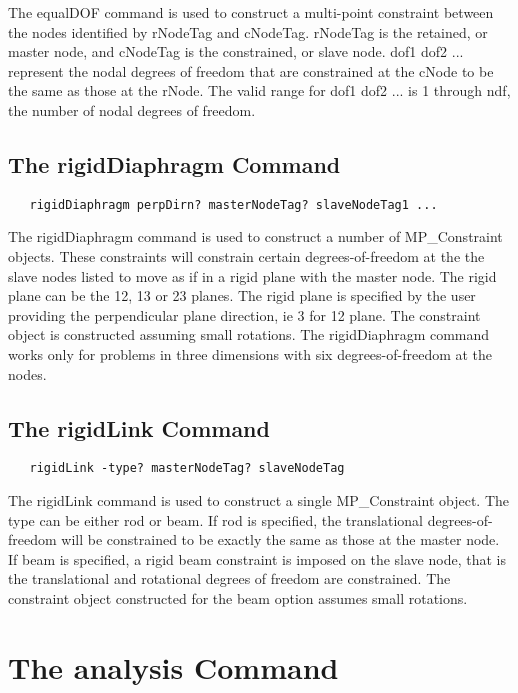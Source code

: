 \documentclass[12pt]{article}
\begin{document}
The equalDOF command is used to construct a multi-point constraint between
the nodes identified by rNodeTag and cNodeTag. rNodeTag is the retained, or
master node, and cNodeTag is the constrained, or slave node. dof1 dof2 ... 
represent the nodal degrees of freedom that are constrained at the cNode to
be the same as those at the rNode. The valid range for dof1 dof2 ... is 1
through ndf, the number of nodal degrees of freedom.

\subsection{The rigidDiaphragm Command}
{\sf\small
\begin{verbatim}
   rigidDiaphragm perpDirn? masterNodeTag? slaveNodeTag1 ...
\end{verbatim}
}

The rigidDiaphragm command is used to construct a number of
MP\_Constraint objects. These constraints will constrain certain
degrees-of-freedom at the the slave nodes listed to move as if in a
rigid plane with the master node. The rigid plane can be the 12, 13 or
23 planes. The rigid plane is specified by the user providing the
perpendicular plane direction, ie 3 for 12 plane. The constraint
object is constructed assuming small rotations. The rigidDiaphragm
command works only for problems in three dimensions with six
degrees-of-freedom at the nodes. 

\subsection{The rigidLink Command}
{\sf\small
\begin{verbatim}
   rigidLink -type? masterNodeTag? slaveNodeTag
\end{verbatim}
}

The rigidLink command is used to construct a single MP\_Constraint object.
The type can be either rod or beam. If rod is specified, the
translational degrees-of-freedom will be constrained to be exactly the
same as those at the master node. If beam is specified, a rigid beam
constraint is imposed on the slave node, that is the translational and
rotational degrees of freedom are constrained. The constraint object
constructed for the beam option assumes small rotations.

\section {The analysis Command}
\end{document}
